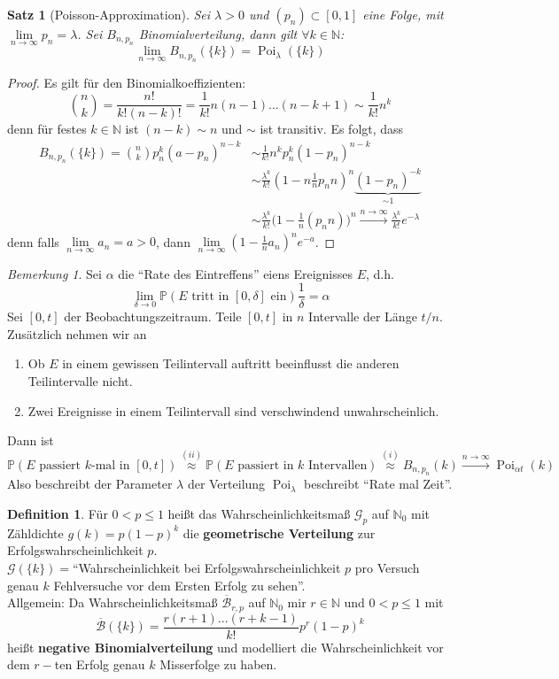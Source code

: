 \documentclass[10pt,a4paper]{article}
\newcommand{\N}{\ensuremath{\mathbb{N}}}
\newcommand{\la}{\ensuremath{\lambda}}
\newcommand{\al}{\ensuremath{\alpha}}
\newcommand{\ol}[1]{\overline{#1}}
\newcommand{\Prb}{\mathbb P}
\newcommand{\scB}{\mathscr B}
\newcommand{\scG}{\mathscr G}
\newcommand{\Poi}{\operatorname{Poi}}
\theoremstyle{plain}
\newtheorem{satz}[theorem]{Satz}
\theoremstyle{definition}
\newtheorem{definition}[theorem]{Definition}
\theoremstyle{remark}
\newtheorem{bem}[theorem]{Bemerkung}
\begin{document}
	\addtocounter{theorem}{-3}
	\begin{satz}[Poisson-Approximation]
		Sei $\la>0$ und $(p_n)\subset[0,1]$ eine Folge, mit $\lim\limits_{n\to\infty}p_n=\la$. Sei $B_{n,p_n}$ Binomialverteilung, dann gilt $\forall k\in\N$:
		\[\lim\limits_{n\to\infty}B_{n,p_n}(\{k\})=\Poi_\la(\{k\})\]
	\end{satz}
	\begin{proof}
		Es gilt für den Binomialkoeffizienten:
		\[\binom{n}{k}=\frac{n!}{k!(n-k)!}=\frac{1}{k!}n(n-1)...(n-k+1)\sim\frac{1}{k!}n^k\]
		denn für festes $k\in\N$ ist $(n-k)\sim n$ und $\sim$ ist transitiv. Es folgt, dass
		\begin{align*}
		B_{n,p_n}(\{k\})=\binom{n}{k}p_n^k(a-p_n)^{n-k}&\sim\frac{1}{k!}n^kp_n^k(1-p_n)^{n-k}\\
		&\sim\frac{\la^k}{k!}\left(1-n\frac{1}{n}p_n n\right)^n\underbrace{(1-p_n)^{-k}}_{\sim 1}\\
		&\sim \frac{\la^k}{k!}\big(1-\frac{1}{n}(p_nn)\big)^n\xrightarrow{n\to\infty}\frac{\la^k}{k!}e^{-\la}
		\end{align*}
		denn falls $\lim\limits_{n\to\infty} a_n=a>0$, dann $\lim\limits_{n\to\infty}\left(1-\frac{1}{n}a_n\right)^ne^{-a}$.
	\end{proof}
	\addtocounter{theorem}{2}
	
	\begin{bem}
		Sei $\al$ die \enquote{Rate des Eintreffens} eiens Ereignisses $E$, d.h.
		\[\lim\limits_{\delta\to0}\Prb(\text{$E$ tritt in $[0,\delta]$ ein})\frac{1}{\delta}=\al\]
		Sei $[0,t]$ der Beobachtungszeitraum. Teile $[0,t]$ in $n$ Intervalle der Länge $t/n$. Zusätzlich nehmen wir an
		\begin{enumerate}[label=(\roman*)]
			\item Ob $E$ in einem gewissen Teilintervall auftritt beeinflusst die anderen Teilintervalle nicht.
			\item Zwei Ereignisse in einem Teilintervall sind verschwindend unwahrscheinlich.
		\end{enumerate}
		Dann ist 
		\[\Prb(\text{$E$ passiert $k$-mal in $[0,t]$})\overset{(ii)}{\approx}\Prb(\text{$E$ passiert in $k$ Intervallen})\overset{(i)}{\approx}B_{n,p_n}(k)\xrightarrow{n\to\infty}\Poi_{\al t}(k)\]
		Also beschreibt der Parameter $\la$ der Verteilung $\Poi_\la$ beschreibt \enquote{Rate mal Zeit}.
	\end{bem}
	\begin{definition}
		Für $0<p\leq 1$ heißt das Wahrscheinlichkeitsmaß $\scG_p$ auf $\N_0$ mit Zähldichte $g(k)=p(1-p)^k$ die \textbf{geometrische Verteilung} zur Erfolgswahrscheinlichkeit $p$.\\
		$\scG(\{k\})=$\enquote{Wahrscheinlichkeit bei Erfolgswahrscheinlichkeit $p$ pro Versuch genau $k$ Fehlversuche vor dem Ersten Erfolg zu sehen}.\\
		Allgemein: Da Wahrscheinlichkeitsmaß $\ol{\scB}_{r,p}$ auf $\N_0$ mir $r\in\N$ und $0<p\le 1$ mit
		\[\ol{\scB}(\{k\})=\frac{r(r+1)...(r+k-1)}{k!}p^r(1-p)^k\]
		heißt \textbf{negative Binomialverteilung} und modelliert die Wahrscheinlichkeit vor dem $r-$ten Erfolg genau $k$ Misserfolge zu haben.
	\end{definition}
\end{document}

